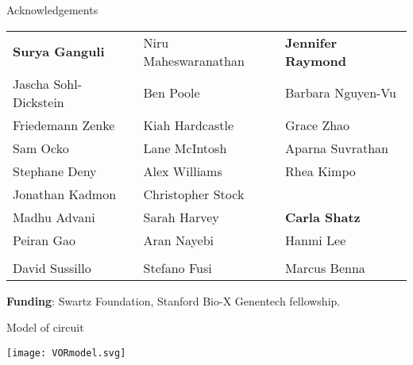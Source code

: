 \documentclass[final]{beamer}%
\begin{document}

\begin{frame}{Acknowledgements}
%
\begin{tabular}{lll}
  \textbf{Surya Ganguli} & Niru Maheswaranathan & \textbf{Jennifer Raymond} \\
  Jascha Sohl-Dickstein  & Ben Poole            & \alert{Barbara Nguyen-Vu} \\
  Friedemann Zenke       & Kiah Hardcastle      & \alert{Grace Zhao}        \\
  Sam Ocko               & Lane McIntosh        & Aparna Suvrathan          \\
  Stephane Deny          & Alex Williams        & Rhea Kimpo                \\
  Jonathan Kadmon        & Christopher Stock    \\
  Madhu Advani           & Sarah Harvey         & \textbf{Carla Shatz}      \\
  Peiran Gao             & Aran Nayebi          & Hanmi Lee                 \\
  \\
  David Sussillo         & Stefano Fusi         & Marcus Benna    \\
\end{tabular}

 \vp\textbf{Funding}: Swartz Foundation, Stanford Bio-X Genentech fellowship.

%
\end{frame}
\appendix


\begin{frame}{Model of circuit}
%
 \begin{center}
   \texttt{[image: VORmodel.svg]}
 \end{center}
%
\end{frame}
\end{document}
